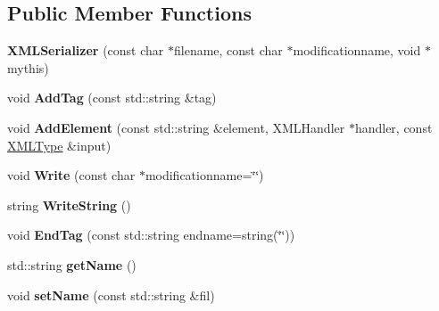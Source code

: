 \subsection*{Public Member Functions}
\begin{DoxyCompactItemize}
\item 
{\bfseries X\+M\+L\+Serializer} (const char $\ast$filename, const char $\ast$modificationname, void $\ast$mythis)\hypertarget{classXMLSerializer_a18b3f29dda4f9df0c42c2579523700b6}{}\label{classXMLSerializer_a18b3f29dda4f9df0c42c2579523700b6}

\item 
void {\bfseries Add\+Tag} (const std\+::string \&tag)\hypertarget{classXMLSerializer_ae22d41e9df1a6befdeefd2bd9050ebb6}{}\label{classXMLSerializer_ae22d41e9df1a6befdeefd2bd9050ebb6}

\item 
void {\bfseries Add\+Element} (const std\+::string \&element, X\+M\+L\+Handler $\ast$handler, const \hyperlink{structXMLType}{X\+M\+L\+Type} \&input)\hypertarget{classXMLSerializer_ab1a2efaf22ebef545448e0b2ccfe2f8e}{}\label{classXMLSerializer_ab1a2efaf22ebef545448e0b2ccfe2f8e}

\item 
void {\bfseries Write} (const char $\ast$modificationname=\char`\"{}\char`\"{})\hypertarget{classXMLSerializer_a122ef9be451a04c32a5465274085155c}{}\label{classXMLSerializer_a122ef9be451a04c32a5465274085155c}

\item 
string {\bfseries Write\+String} ()\hypertarget{classXMLSerializer_a1491230f8706f514e22fed00d298e06b}{}\label{classXMLSerializer_a1491230f8706f514e22fed00d298e06b}

\item 
void {\bfseries End\+Tag} (const std\+::string endname=string(\char`\"{}\char`\"{}))\hypertarget{classXMLSerializer_ac45e9be343385b1f4c0e02f796c957b6}{}\label{classXMLSerializer_ac45e9be343385b1f4c0e02f796c957b6}

\item 
std\+::string {\bfseries get\+Name} ()\hypertarget{classXMLSerializer_a995d658a610de57400aefb9f0cc0dd48}{}\label{classXMLSerializer_a995d658a610de57400aefb9f0cc0dd48}

\item 
void {\bfseries set\+Name} (const std\+::string \&fil)\hypertarget{classXMLSerializer_a67011af765098ded8a85b28ac80ed8f5}{}\label{classXMLSerializer_a67011af765098ded8a85b28ac80ed8f5}

\end{DoxyCompactItemize}
